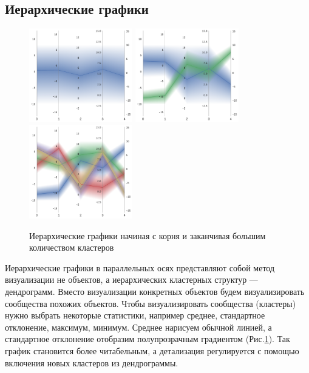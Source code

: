 \documentclass[12pt,fleqn]{article}
\begin{document}
\newpage

\subsection{Иерархические графики}

\vspace{10pt}

\begin{figure}[htb]
     \centering
        \includegraphics[width=4.5cm]{h_clustering_1.pdf} \hfill
        \includegraphics[width=4.5cm]{h_clustering_2.pdf} \hfill
        \includegraphics[width=4.5cm]{h_clustering_5.pdf} \hfill
    \caption{Иерархические графики начиная с корня и заканчивая большим количеством кластеров}
    \label{hierarchical_coords}
\end{figure}


Иерархические графики в параллельных осях представляют собой метод визуализации не объектов, а иерархических
кластерных структур --- дендрограмм. Вместо визуализации конкретных объектов будем
визуализировать сообщества похожих объектов. Чтобы визуализировать сообщества (кластеры)
нужно выбрать некоторые статистики, например среднее, стандартное отклонение, максимум, минимум. Среднее нарисуем обычной линией, а 
стандартное отклонение отобразим полупрозрачным градиентом (Рис.\ref{hierarchical_coords}).
Так график становится более читабельным, а детализация регулируется с
помощью включения новых кластеров из дендрограммы.\cite{hierarchical}
\end{document}
